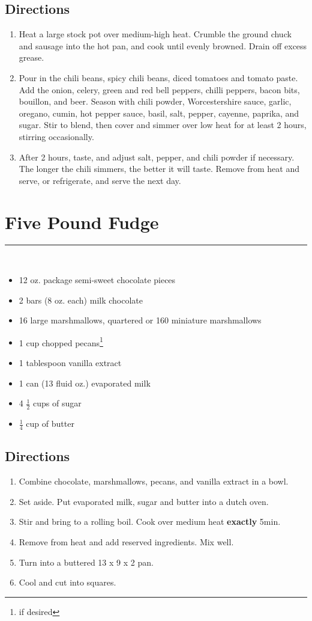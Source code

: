 \documentclass[12pt]{article}
\def \hzline{\noindent \rule[0mm]{\textwidth}{1pt}}
\begin{document}
\subsection*{Directions}
\begin{enumerate}
\item Heat a large stock pot over medium-high heat. Crumble the ground chuck and sausage into the hot pan, and cook until evenly browned. Drain off excess grease.
\item Pour in the chili beans, spicy chili beans, diced tomatoes and tomato paste. Add the onion, celery, green and red bell peppers, chilli peppers, bacon bits, bouillon, and beer. Season with chili powder, Worcestershire sauce, garlic, oregano, cumin, hot pepper sauce, basil, salt, pepper, cayenne, paprika, and sugar. Stir to blend, then cover and simmer over low heat for at least 2 hours, stirring occasionally.
\item After 2 hours, taste, and adjust salt, pepper, and chili powder if necessary. The longer the chili simmers, the better it will taste. Remove from heat and serve, or refrigerate, and serve the next day.
\end{enumerate}


\section*{Five Pound Fudge} \hzline \\
\begin{itemize}
  \item 12 oz. package semi-sweet chocolate pieces 
  \item 2 bars (8 oz. each) milk chocolate 
  \item 16 large marshmallows, quartered or 160 miniature marshmallows 
  \item 1 cup chopped pecans\footnote{if desired}
  \item 1 tablespoon vanilla extract 
  \item 1 can (13 fluid oz.) evaporated milk 
  \item 4 $\frac{1}{2}$ cups of sugar 
  \item $\frac{1}{4}$ cup of butter 
\end{itemize}

\subsection*{Directions}
\begin{enumerate}
  \item Combine chocolate, marshmallows, pecans, and vanilla extract in a bowl. 
  \item Set aside. Put evaporated milk, sugar and butter into a dutch oven. 
  \item Stir and bring to a rolling boil. Cook over medium heat {\bf exactly} 5min.
  \item Remove from heat and add reserved ingredients. Mix well. 
  \item Turn into a buttered 13 x 9 x 2 pan. 
  \item Cool and cut into squares.
\end{enumerate}
\end{document}
